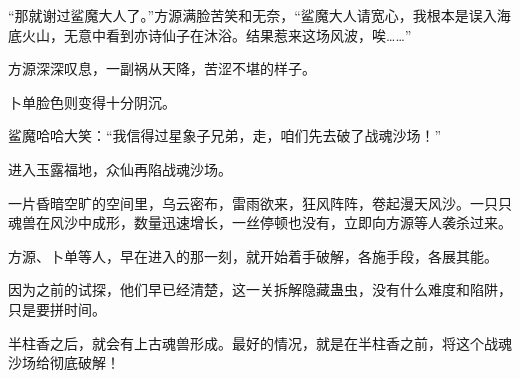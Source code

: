 \begin{this_body}
“那就谢过鲨魔大人了。”方源满脸苦笑和无奈，“鲨魔大人请宽心，我根本是误入海底火山，无意中看到亦诗仙子在沐浴。结果惹来这场风波，唉……”

方源深深叹息，一副祸从天降，苦涩不堪的样子。

卜单脸色则变得十分阴沉。

鲨魔哈哈大笑：“我信得过星象子兄弟，走，咱们先去破了战魂沙场！”

进入玉露福地，众仙再陷战魂沙场。

一片昏暗空旷的空间里，乌云密布，雷雨欲来，狂风阵阵，卷起漫天风沙。一只只魂兽在风沙中成形，数量迅速增长，一丝停顿也没有，立即向方源等人袭杀过来。

方源、卜单等人，早在进入的那一刻，就开始着手破解，各施手段，各展其能。

因为之前的试探，他们早已经清楚，这一关拆解隐藏蛊虫，没有什么难度和陷阱，只是要拼时间。

半柱香之后，就会有上古魂兽形成。最好的情况，就是在半柱香之前，将这个战魂沙场给彻底破解！

\end{this_body}

